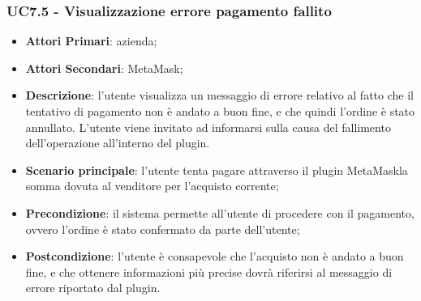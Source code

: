 \subsubsection{UC7.5 - Visualizzazione errore pagamento fallito}
\begin{itemize}
	\item \textbf{Attori Primari}: azienda;
	\item \textbf{Attori Secondari}: MetaMask\glo;
	\item \textbf{Descrizione}:
	l'utente visualizza un messaggio di errore relativo al fatto che il tentativo di pagamento non è andato a buon fine, e che quindi l'ordine è stato annullato. L'utente viene invitato ad informarsi sulla causa del fallimento dell'operazione all'interno del plugin.
	\item \textbf{Scenario principale}: l'utente tenta pagare attraverso il plugin MetaMask\glosp la somma dovuta al venditore per l'acquisto corrente;
	\item \textbf{Precondizione}: il sistema permette all'utente di procedere con il pagamento, ovvero l'ordine è stato confermato da parte dell'utente;
	\item \textbf{Postcondizione}:
	l'utente è consapevole che l'acquisto non è andato a buon fine, e che ottenere informazioni più precise dovrà riferirsi al messaggio di errore riportato dal plugin. 
\end{itemize} 







